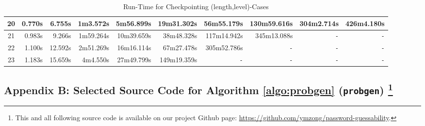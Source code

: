 \documentclass{article} %
\theoremstyle{definition}
\theoremstyle{theorem}
\theoremstyle{remark}
\theoremstyle{remark}
\begin{document}
\begin{table}[!htbp]
\begin{center}
\begin{tabular}{|c||r|r|r|r|r|r|r|r|r|}
                20 &0.770s &6.755s &1m3.572s & 5m56.899s & 19m31.302s & 56m55.179s & 130m59.616s & 304m2.714s & 426m4.180s \\\hline
                21 &0.983s &9.266s &1m59.264s & 10m39.659s & 38m48.328s & 117m14.942s & 345m13.088s & \texttt{-} & \texttt{-} \\\hline
                22 &1.100s &12.592s & 2m51.269s & 16m16.114s & 67m27.478s & 305m52.786s & \texttt{-} & \texttt{-} & \texttt{-} \\\hline
                23 &\;\; 1.183s & \;\; 15.659s & 4m4.550s & 27m49.799s & 149m19.359s & \texttt{-} & \texttt{-} & \texttt{-} & \texttt{-} \\\hline
            \end{tabular}
        \end{center}
        \vspace{-5pt}
        \caption{Run-Time for Checkpointing (length,level)-Cases}
        \label{table:passtime}
    \end{table}

\vspace{\fill}
\pagebreak
\subsection*{Appendix B: Selected Source Code for Algorithm \ref{algo:probgen} (\texttt{probgen}) \protect\footnote{This and all following source code is available on our project Github page: \url{https://github.com/ymzong/password-guessability}.}}
\end{document}
